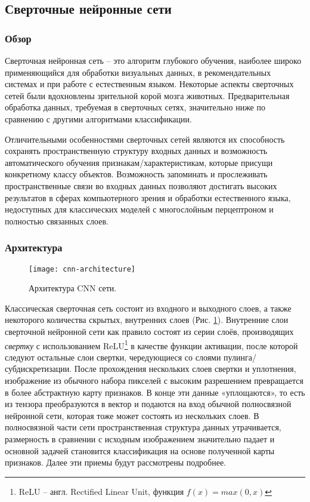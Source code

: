 \subsection{Сверточные нейронные сети}
\subsubsection{Обзор}
Сверточная нейронная сеть -- это алгоритм глубокого обучения, наиболее широко применяющийся для обработки визуальных данных, в рекомендательных системах\cite{cnn-recomendation-system} и при работе с естественным языком\cite{cnn-nlp}. Некоторые аспекты сверточных сетей были вдохновлены зрительной корой мозга животных\cite{cnn-neocognitron}. Предварительная обработка данных, требуемая в сверточных сетях, значительно ниже по сравнению с другими алгоритмами классификации.

Отличительными особенностями сверточных сетей являются их способность сохранять пространственную структуру входных данных и возможность автоматического обучения признакам/характеристикам, которые присущи конкретному классу объектов. Возможность запоминать и прослеживать пространственные связи во входных данных позволяют достигать высоких результатов в сферах компьютерного зрения и обработки естественного языка, недоступных для классических моделей с многослойным перцептроном и полностью связанных слоев.

\subsubsection{Архитектура}
\begin{figure}[h]
	\centering
	\texttt{[image: cnn-architecture]}
	\caption{Архитектура CNN сети.}
	\label{fig:cnn-architecture}
\end{figure}

Классическая сверточная сеть состоит из входного и выходного слоев, а также некоторого количества скрытых, внутренних слоев (Рис. \ref{fig:cnn-architecture}). Внутренние слои сверточной нейронной сети как правило состоят из серии слоёв, производящих \emph{свертку} с использованием ReLU\footnote{ReLU -- англ. Rectified Linear Unit, функция $f(x)=max(0,x)$} в качестве функции активации, после которой следуют остальные слои свертки, чередующиеся со слоями пулинга/субдискретизации. После прохождения нескольких слоев свертки и уплотнения, изображение из обычного набора пикселей с высоким разрешением превращается в более абстрактную карту признаков. В конце эти данные «уплощаются», то есть из тензора преобразуются в вектор и подаются на вход обычной полносвязной нейронной сети, которая тоже может состоять из нескольких слоев. В полносвязной части сети пространственная структура данных утрачивается, размерность в сравнении с исходным изображением значительно падает и основной задачей становится классификация на основе полученной карты признаков. Далее эти приемы будут рассмотрены подробнее.

